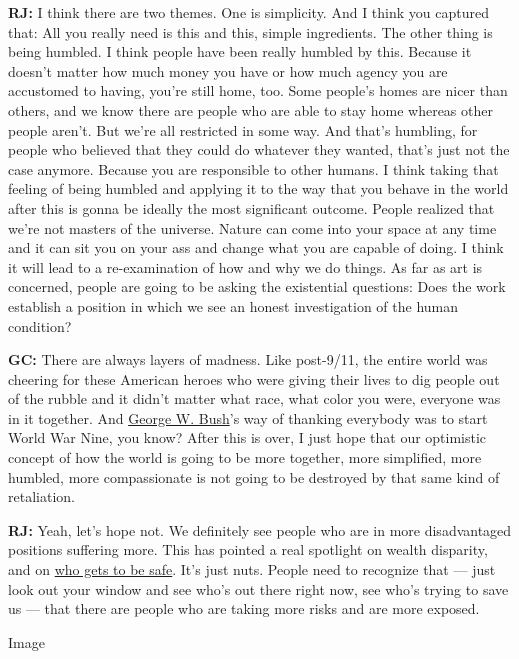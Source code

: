 \textbf{RJ:} I think there are two themes. One is simplicity. And I
think you captured that: All you really need is this and this, simple
ingredients. The other thing is being humbled. I think people have been
really humbled by this. Because it doesn't matter how much money you
have or how much agency you are accustomed to having, you're still home,
too. Some people's homes are nicer than others, and we know there are
people who are able to stay home whereas other people aren't. But we're
all restricted in some way. And that's humbling, for people who believed
that they could do whatever they wanted, that's just not the case
anymore. Because you are responsible to other humans. I think taking
that feeling of being humbled and applying it to the way that you behave
in the world after this is gonna be ideally the most significant
outcome. People realized that we're not masters of the universe. Nature
can come into your space at any time and it can sit you on your ass and
change what you are capable of doing. I think it will lead to a
re-examination of how and why we do things. As far as art is concerned,
people are going to be asking the existential questions: Does the work
establish a position in which we see an honest investigation of the
human condition?

\textbf{GC:} There are always layers of madness. Like post-9/11, the
entire world was cheering for these American heroes who were giving
their lives to dig people out of the rubble and it didn't matter what
race, what color you were, everyone was in it together. And
\href{https://www.nytimes3xbfgragh.onion/topic/person/george-w-bush}{George
W. Bush}'s way of thanking everybody was to start World War Nine, you
know? After this is over, I just hope that our optimistic concept of how
the world is going to be more together, more simplified, more humbled,
more compassionate is not going to be destroyed by that same kind of
retaliation.

\textbf{RJ:} Yeah, let's hope not. We definitely see people who are in
more disadvantaged positions suffering more. This has pointed a real
spotlight on wealth disparity, and on
\href{https://www.nytimes3xbfgragh.onion/interactive/2020/04/03/us/coronavirus-stay-home-rich-poor.html}{who
gets to be safe}. It's just nuts. People need to recognize that --- just
look out your window and see who's out there right now, see who's trying
to save us --- that there are people who are taking more risks and are
more exposed.

Image

